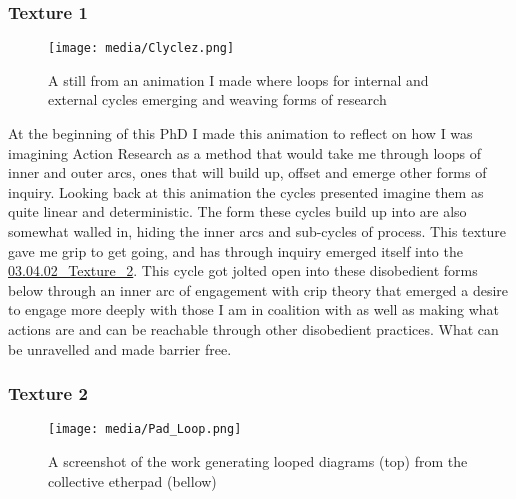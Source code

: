 \hypertarget{texture-1}{%
\subsubsection{Texture 1}\label{texture-1}}

\begin{figure}
\hypertarget{fig:cyclez}{%
\centering
\texttt{[image: media/Clyclez.png]}
\caption{A still from an animation I made where loops for internal and
external cycles emerging and weaving forms of
research}\label{fig:cyclez}
}
\end{figure}

At the beginning of this PhD I made this animation to reflect on how I
was imagining Action Research as a method that would take me through
loops of inner and outer arcs, ones that will build up, offset and
emerge other forms of inquiry. Looking back at this animation the cycles
presented imagine them as quite linear and deterministic. The form these
cycles build up into are also somewhat walled in, hiding the inner arcs
and sub-cycles of process. This texture gave me grip to get going, and
has through inquiry emerged itself into the
\href{03.04.02_Texture_2.md}{03.04.02\_Texture\_2}. This cycle got
jolted open into these disobedient forms below through an inner arc of
engagement with crip theory that emerged a desire to engage more deeply
with those I am in coalition with as well as making what actions are and
can be reachable through other disobedient practices. What can be
unravelled and made barrier free.

\hypertarget{texture-2}{%
\subsubsection{Texture 2}\label{texture-2}}

\begin{figure}
\hypertarget{fig:loops}{%
\centering
\texttt{[image: media/Pad\_Loop.png]}
\caption{A screenshot of the work generating looped diagrams (top) from
the collective etherpad (bellow)}\label{fig:loops}
}
\end{figure}

